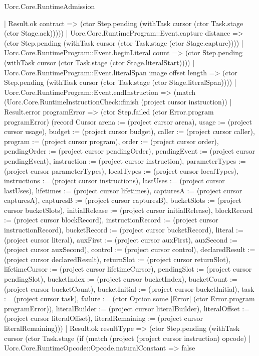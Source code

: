 \begin{lexlean}{Uorc.Core.RuntimeAdmission}
\begin{semanticmodule}
{            | Result.ok contract => (ctor Step.pending (withTask cursor (ctor Task.stage (ctor Stage.ack)))))
          | Uorc.Core.RuntimeProgram::Event.capture distance => (ctor Step.pending (withTask cursor (ctor Task.stage (ctor Stage.capture))))
          | Uorc.Core.RuntimeProgram::Event.beginLiteral count => (ctor Step.pending (withTask cursor (ctor Task.stage (ctor Stage.literalStart))))
          | Uorc.Core.RuntimeProgram::Event.literalSpan image offset length => (ctor Step.pending (withTask cursor (ctor Task.stage (ctor Stage.literalSpan))))
          | Uorc.Core.RuntimeProgram::Event.endInstruction => (match (Uorc.Core.RuntimeInstructionCheck::finish (project cursor instruction))
            | Result.error programError => (ctor Step.failed (ctor Error.program programError) (record Cursor {arena := (project cursor arena), usage := (project cursor usage), budget := (project cursor budget), caller := (project cursor caller), program := (project cursor program), order := (project cursor order), pendingOrder := (project cursor pendingOrder), pendingEvent := (project cursor pendingEvent), instruction := (project cursor instruction), parameterTypes := (project cursor parameterTypes), localTypes := (project cursor localTypes), instructions := (project cursor instructions), lastUses := (project cursor lastUses), lifetimes := (project cursor lifetimes), capturesA := (project cursor capturesA), capturesB := (project cursor capturesB), bucketSlots := (project cursor bucketSlots), initialRelease := (project cursor initialRelease), blockRecord := (project cursor blockRecord), instructionRecord := (project cursor instructionRecord), bucketRecord := (project cursor bucketRecord), literal := (project cursor literal), auxFirst := (project cursor auxFirst), auxSecond := (project cursor auxSecond), control := (project cursor control), declaredResult := (project cursor declaredResult), returnSlot := (project cursor returnSlot), lifetimeCursor := (project cursor lifetimeCursor), pendingSlot := (project cursor pendingSlot), bucketIndex := (project cursor bucketIndex), bucketCount := (project cursor bucketCount), bucketInitial := (project cursor bucketInitial), task := (project cursor task), failure := (ctor Option.some [Error] (ctor Error.program programError)), literalBuilder := (project cursor literalBuilder), literalOffset := (project cursor literalOffset), literalRemaining := (project cursor literalRemaining)}))
            | Result.ok resultType => (ctor Step.pending (withTask cursor (ctor Task.stage (if (match (project (project cursor instruction) opcode)
              | Uorc.Core.RuntimeOpcode::Opcode.naturalConstant => false
}
\end{semanticmodule}
\end{lexlean}
